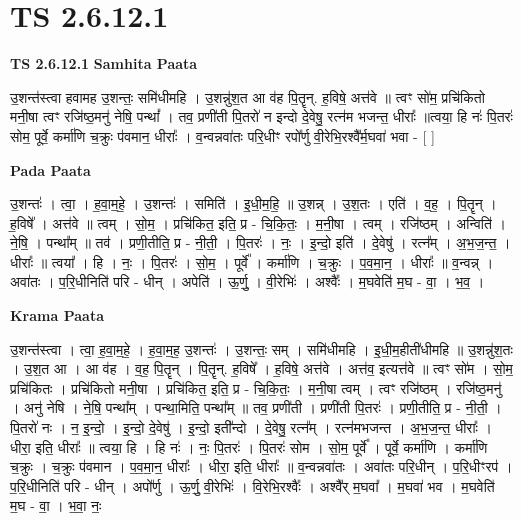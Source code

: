 \documentclass[17pt]{extarticle}
\begin{document}
\section{ TS 2.6.12.1 }

\textbf{TS 2.6.12.1 } \newline
\textbf{Samhita Paata} \newline

उ॒शन्त॑स्त्वा हवामह उ॒शन्तः॒ समि॑धीमहि । उ॒शन्नु॑श॒त आ व॑ह पि॒तॄन्. ह॒विषे॒ अत्त॑वे ॥ त्वꣳ सो॑म॒ प्रचि॑कितो मनी॒षा त्वꣳ रजि॑ष्ठ॒मनु॑ नेषि॒ पन्थां᳚ । तव॒ प्रणी॑ती पि॒तरो॑ न इन्दो दे॒वेषु॒ रत्न॑म भजन्त॒ धीराः᳚ ॥त्वया॒ हि नः॑ पि॒तरः॑ सोम॒ पूर्वे॒ कर्मा॑णि च॒क्रुः प॑वमान॒ धीराः᳚ । व॒न्वन्नवा॑तः परि॒धीꣳ रपो᳚र्णु वी॒रेभि॒रश्वै᳚र्म॒घवा॑ भवा - [  ] \newline

\textbf{Pada Paata} \newline

उ॒शन्तः॑ । त्वा॒ । ह॒वा॒म॒हे॒ । उ॒शन्तः॑ । समिति॑ । इ॒धी॒म॒हि॒ ॥ उ॒शन्न् । उ॒श॒तः । एति॑ । व॒ह॒ । पि॒तॄन् । ह॒विषे᳚ । अत्त॑वे ॥ त्वम् । सो॒म॒ । प्रचि॑कित॒ इति॒ प्र - चि॒कि॒तः॒ । म॒नी॒षा । त्वम् । रजि॑ष्ठम् । अन्विति॑ । ने॒षि॒ । पन्था᳚म् ॥ तव॑ । प्रणी॒तीति॒ प्र - नी॒ती॒ । पि॒तरः॑ । नः॒ । इ॒न्दो॒ इति॑ । दे॒वेषु॑ । रत्न᳚म् । अ॒भ॒ज॒न्त॒ । धीराः᳚ ॥ त्वया᳚ । हि । नः॒ । पि॒तरः॑ । सो॒म॒ । पूर्वे᳚ । कर्मा॑णि । च॒क्रुः । प॒व॒मा॒न॒ । धीराः᳚ ॥ व॒न्वन्न् । अवा॑तः । प॒रि॒धीनिति॑ परि - धीन् । अपेति॑ । ऊ॒र्णु॒ । वी॒रेभिः॑ । अश्वैः᳚ । म॒घवेति॑ म॒घ - वा॒ । भ॒व॒ ।  \newline


\textbf{Krama Paata} \newline

उ॒शन्त॑स्त्वा । त्वा॒ ह॒वा॒म॒हे॒ । ह॒वा॒म॒ह॒ उ॒शन्तः॑ । उ॒शन्तः॒ सम् । समि॑धीमहि । इ॒धी॒म॒हीती॑धीमहि ॥ उ॒शन्नु॑श॒तः । उ॒श॒त आ । आ व॑ह । व॒ह॒ पि॒तॄन् । पि॒तॄन्. ह॒विषे᳚ । ह॒विषे॒ अत्त॑वे । अत्त॑व॒ इत्यत्त॑वे ॥ त्वꣳ सो॑म । सो॒म॒ प्रचि॑कितः । प्रचि॑कितो मनी॒षा । प्रचि॑कित॒ इति॒ प्र - चि॒कि॒तः॒ । म॒नी॒षा त्वम् । त्वꣳ रजि॑ष्ठम् । रजि॑ष्ठ॒मनु॑ । अनु॑ नेषि । ने॒षि॒ पन्था᳚म् । पन्था॒मिति॒ पन्था᳚म् ॥ तव॒ प्रणी॑ती । प्रणी॑ती पि॒तरः॑ । प्रणी॒तीति॒ प्र - नी॒ती॒ । पि॒तरो॑ नः । न॒ इ॒न्दो॒ । इ॒न्दो॒ दे॒वेषु॑ । इ॒न्दो॒ इती᳚न्दो । दे॒वेषु॒ रत्न᳚म् । रत्न॑मभजन्त । अ॒भ॒ज॒न्त॒ धीराः᳚ । धीरा॒ इति॒ धीराः᳚ ॥ त्वया॒ हि । हि नः॑ । नः॒ पि॒तरः॑ । पि॒तरः॑ सोम । सो॒म॒ पूर्वे᳚ । पूर्वे॒ कर्मा॑णि । कर्मा॑णि च॒क्रुः । च॒क्रुः प॑वमान । प॒व॒मा॒न॒ धीराः᳚ । धीरा॒ इति॒ धीराः᳚ ॥ व॒न्वन्नवा॑तः । अवा॑तः परि॒धीन् । प॒रि॒धीꣳरप॑ । प॒रि॒धीनिति॑ परि - धीन् । अपो᳚र्णु । ऊ॒र्णु॒ वी॒रेभिः॑ । वि॒रेभि॒रश्वैः᳚ । अश्वै᳚र् म॒घवा᳚ । म॒घवा॑ भव । म॒घवेति॑ म॒घ - वा॒ । भ॒वा॒ नः॒ \newline
\end{document}
